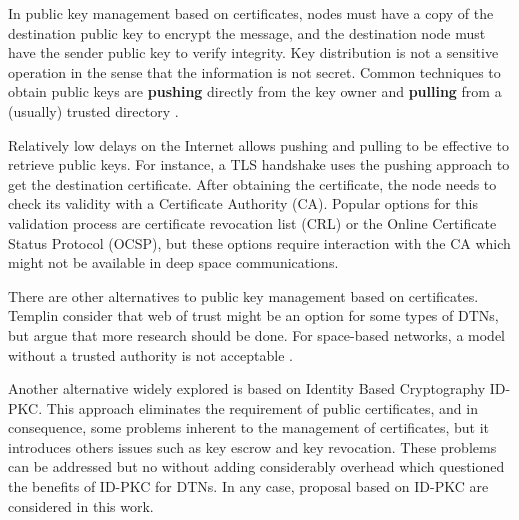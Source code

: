 
In public key management based on certificates,  nodes must have a copy of the destination public key to encrypt the message, and the destination node must have the sender public key to verify integrity. Key distribution is not a sensitive operation in the sense that the information is not secret.  Common techniques to obtain public keys are \textbf{pushing} directly from the key owner and \textbf{pulling} from a (usually) trusted directory \cite{martineveryday}.

Relatively low delays on the Internet allows pushing and pulling to be effective to retrieve public keys. For instance, a TLS handshake uses the pushing approach to get the destination certificate. After obtaining the certificate, the node needs to check its validity with a Certificate Authority (CA). Popular options for this validation process are certificate revocation list (CRL) or the Online Certificate Status Protocol (OCSP), but these options require interaction with the CA which might not be available in deep space communications. 


There are other alternatives to public key management based on certificates. Templin \cite{templin-dtnskmps-00} consider that web of trust might be an option for some types of DTNs, but argue that more research should be done. For space-based networks, a model without a trusted authority is not acceptable \cite{viswanathan-dtn-pkdn-00,burleigh-dtnwg-dtka-01,ivancic2009security}.  

Another alternative widely explored is based on Identity Based Cryptography ID-PKC. This approach eliminates the requirement of public certificates, and in consequence, some problems inherent to the management of certificates, but it introduces others issues such as key escrow and key revocation. These problems can be addressed but no without adding considerably overhead which questioned the benefits of ID-PKC for DTNs. In any case, proposal based on ID-PKC are considered in this work.


